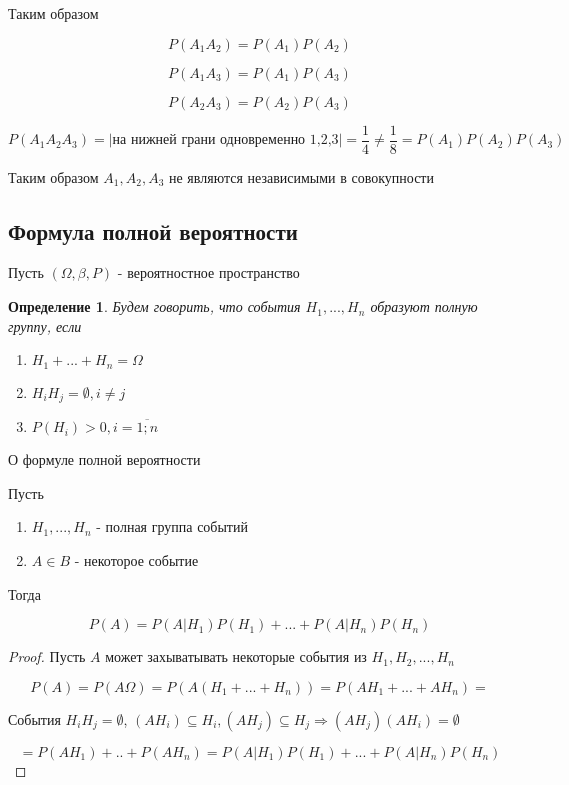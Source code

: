 \documentclass[a4paper, 14pt]{report}
\newtheorem{defenition}{Определение}[section]
\begin{document}
Таким образом

$$
P(A_1A_2) = P(A_1)P(A_2)
$$


$$
P(A_1A_3) = P(A_1)P(A_3)
$$

$$
P(A_2A_3) = P(A_2)P(A_3)
$$

$$
P(A_1A_2A_3) = |\text{на нижней грани одновременно 1,2,3}| = \frac{1}{4} \ne \frac{1}{8} = P(A_1)P(A_2)P(A_3)
$$

Таким образом $A_1,A_2,A_3$ не являются независимыми в совокупности

\subsection{Формула полной вероятности}

Пусть $(\Omega, \beta, P)$ - вероятностное пространство

\begin{defenition}
    Будем говорить, что события $H_1, ..., H_n$ образуют полную группу, если

    \begin{enumerate}
        \item $H_1 + ... + H_n = \Omega$
        \item $H_i H_j = \emptyset, i\ne j$
        \item $P(H_i) > 0, i = \overline{1;n}$
    \end{enumerate}
\end{defenition}

\begin{theorem}
    О формуле полной вероятности

    Пусть

    \begin{enumerate}
        \item $H_1,...,H_n$ - полная группа событий
        \item $A \in B$ - некоторое событие
    \end{enumerate}

    Тогда

    $$
    P(A) = P(A|H_1)P(H_1) + ... + P(A|H_n)P(H_n)
    $$
\end{theorem}

\begin{proof}
   Пусть $A$ может захыватывать некоторые события из $H_1,H_2,...,H_n$

   $$
   P(A) = P(A \Omega) = P(A(H_1+...+H_n)) = P(AH_1 + ... + AH_n) = 
   $$

   События $H_iH_j = \emptyset$, $(AH_i) \subseteq H_i, (AH_j) \subseteq H_j  \Rightarrow (AH_j)(AH_i) = \emptyset$

   $$
   = P(AH_1) + .. + P(AH_n) = P(A|H_1)P(H_1) + ... + P(A|H_n)P(H_n)
   $$
\end{proof}
\end{document}
